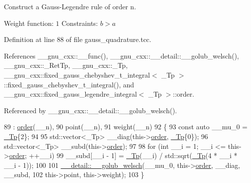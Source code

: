 Construct a Gauss-\/\+Legendre rule of order {\ttfamily n}.

Weight function\+: $ 1 $ Constraints\+: $ b > a $ 

Definition at line 88 of file gauss\+\_\+quadrature.\+tcc.



References \+\_\+\+\_\+gnu\+\_\+cxx\+::\+\_\+\+\_\+func(), \+\_\+\+\_\+gnu\+\_\+cxx\+::\+\_\+\+\_\+detail\+::\+\_\+\+\_\+golub\+\_\+welsch(), \+\_\+\+\_\+gnu\+\_\+cxx\+::\+\_\+\+Ret\+Tp, \+\_\+\+\_\+gnu\+\_\+cxx\+::\+\_\+\+Tp, \+\_\+\+\_\+gnu\+\_\+cxx\+::fixed\+\_\+gauss\+\_\+chebyshev\+\_\+t\+\_\+integral$<$ \+\_\+\+Tp $>$\+::fixed\+\_\+gauss\+\_\+chebyshev\+\_\+t\+\_\+integral(), and \+\_\+\+\_\+gnu\+\_\+cxx\+::fixed\+\_\+gauss\+\_\+legendre\+\_\+integral$<$ \+\_\+\+Tp $>$\+::order.



Referenced by \+\_\+\+\_\+gnu\+\_\+cxx\+::\+\_\+\+\_\+detail\+::\+\_\+\+\_\+golub\+\_\+welsch().


\begin{DoxyCode}
89     : \hyperlink{struct____gnu__cxx_1_1fixed__gauss__legendre__integral_a51724253e7545ed73de4be77aabf951a}{order}(\_\_n),
90       point(\_\_n),
91       weight(\_\_n)
92     \{
93       \textcolor{keyword}{const} \textcolor{keyword}{auto} \_\_mu\_0 = \hyperlink{namespace____gnu__cxx_a3b19a9c800ca194374ef9172290f7d79}{\_Tp}\{2\};
94 
95       std::vector<\_Tp> \_\_diag(this->\hyperlink{struct____gnu__cxx_1_1fixed__gauss__legendre__integral_a51724253e7545ed73de4be77aabf951a}{order}, \hyperlink{namespace____gnu__cxx_a3b19a9c800ca194374ef9172290f7d79}{\_Tp}\{0\});
96       std::vector<\_Tp> \_\_subd(this->\hyperlink{struct____gnu__cxx_1_1fixed__gauss__legendre__integral_a51724253e7545ed73de4be77aabf951a}{order});
97 
98       \textcolor{keywordflow}{for} (\textcolor{keywordtype}{int} \_\_i = 1; \_\_i <= this->\hyperlink{struct____gnu__cxx_1_1fixed__gauss__legendre__integral_a51724253e7545ed73de4be77aabf951a}{order}; ++\_\_i)
99         \_\_subd[\_\_i - 1] = \hyperlink{namespace____gnu__cxx_a3b19a9c800ca194374ef9172290f7d79}{\_Tp}(\_\_i) / std::sqrt(\hyperlink{namespace____gnu__cxx_a3b19a9c800ca194374ef9172290f7d79}{\_Tp}(4 * \_\_i * \_\_i - 1));
100 
101       \hyperlink{namespace____gnu__cxx_1_1____detail_aa9f299bb7c04606a9a9aab3ab9e4f4c8}{\_\_detail::\_\_golub\_welsch}(\_\_mu\_0, this->\hyperlink{struct____gnu__cxx_1_1fixed__gauss__legendre__integral_a51724253e7545ed73de4be77aabf951a}{order}, \_\_diag, \_\_subd,
102                                this->point, this->weight);
103     \}
\end{DoxyCode}


